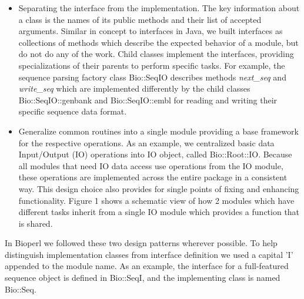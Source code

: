 \documentclass[12pt]{article}
\begin{document}
\begin{itemize}

\item Separating the interface from the implementation.  The key
information about a class is the names of its public methods and their
list
of accepted arguments.  Similar in concept to interfaces in Java, we
built interfaces as collections of methods which describe the expected
behavior of a module, but do not do any of the work.  Child classes
implement the interfaces, providing specializations of their
parents to perform specific tasks.  
For example, the sequence parsing factory class Bio::SeqIO describes
methods \textit{next\_seq} and \textit{write\_seq} which are
implemented differently by the child classes Bio::SeqIO::genbank and
Bio::SeqIO::embl for reading and writing their specific sequence data
format.

\item Generalize common routines into a single module providing a base
framework for the respective operations.  As an example, we
centralized basic data Input/Output (IO) operations into IO object,
called Bio::Root::IO. Because all modules that need IO data access use
operations from the IO module, these operations are implemented across
the entire package in a consistent way. This design choice also
provides for single points of fixing and enhancing functionality.
Figure 1 shows a schematic view of how 2 modules which have different
tasks inherit from a single IO module which provides a function that
is shared.

\end{itemize}

In Bioperl we followed these two design patterns \cite{gangoffour}
wherever possible.  To help distinguish implementation classes from
interface definition we used a capital 'I' appended to the module
name. As an example, the interface for a full-featured sequence object
is defined in Bio::SeqI, and the implementing class is named Bio::Seq.
\end{document}
